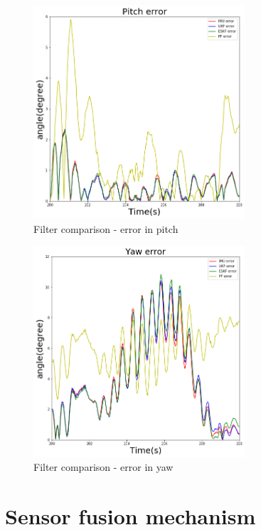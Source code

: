 \begin{figure}[h]
\centering
	\includegraphics[width=0.7\textwidth]{figs/pitch.png}
	\caption{Filter comparison - error in pitch}
	\label{fig:ch:errorPitch}
\end{figure}

\begin{figure}[h]
\centering
	\includegraphics[width=0.7\textwidth]{figs/yaw.png}
	\caption{Filter comparison - error in yaw}
	\label{fig:ch:errorYaw}
\end{figure}







\section{Sensor fusion mechanism}


